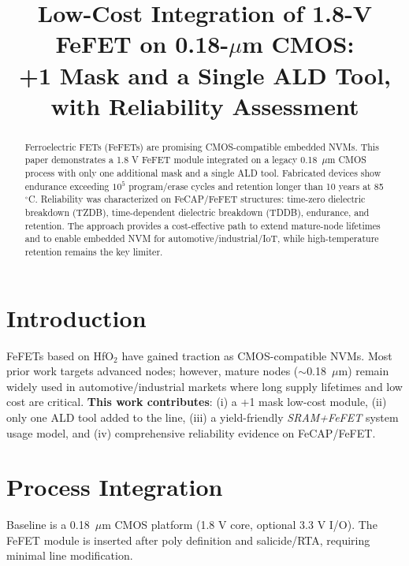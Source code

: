 \documentclass[conference]{IEEEtran}
\begin{document}
\title{Low-Cost Integration of 1.8-V FeFET on 0.18-$\mu$m CMOS:\\
+1 Mask and a Single ALD Tool, with Reliability Assessment}

\author{
}

\maketitle

\begin{abstract}
Ferroelectric FETs (FeFETs) are promising CMOS-compatible embedded NVMs. 
This paper demonstrates a 1.8 V FeFET module integrated on a legacy 0.18~$\mu$m CMOS process with only one additional mask and a single ALD tool. 
Fabricated devices show endurance exceeding $10^5$ program/erase cycles and retention longer than 10 years at 85$^\circ$C. 
Reliability was characterized on FeCAP/FeFET structures: time-zero dielectric breakdown (TZDB), time-dependent dielectric breakdown (TDDB), endurance, and retention. 
The approach provides a cost-effective path to extend mature-node lifetimes and to enable embedded NVM for automotive/industrial/IoT, while high-temperature retention remains the key limiter.
\end{abstract}

\section{Introduction}
FeFETs based on HfO$_2$ have gained traction as CMOS-compatible NVMs. 
Most prior work targets advanced nodes; however, mature nodes ($\sim$0.18~$\mu$m) remain widely used in automotive/industrial markets where long supply lifetimes and low cost are critical. 
\textbf{This work contributes}: (i) a +1 mask low-cost module, (ii) only one ALD tool added to the line, (iii) a yield-friendly \textit{SRAM+FeFET} system usage model, and (iv) comprehensive reliability evidence on FeCAP/FeFET.

\section{Process Integration}
Baseline is a 0.18~$\mu$m CMOS platform (1.8 V core, optional 3.3 V I/O). 
The FeFET module is inserted after poly definition and salicide/RTA, requiring minimal line modification.
\end{document}
